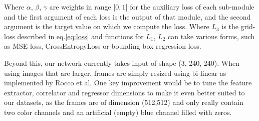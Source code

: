 \documentclass[10pt,conference,compsocconf]{IEEEtran}
\begin{document}
Where $\alpha$, $\beta$, $\gamma$ are weights in range $]0,1]$ for the auxiliary loss of each sub-module and the first argument of each loss is the output of that module, and the second argument is the target value on which we compute the loss. Where $L_{3}$ is the grid-loss described in eq.\ref{eq:loss} and functions for $L_{1}$, $L_{2}$ can take various forms, such as MSE loss, CrossEntropyLoss or bounding box regression loss. 

Beyond this, our network currently takes input of shape (3, 240, 240). When using images that are larger, frames are simply resized using bi-linear as implemented by Rocco et al. One key improvement would be to tune the feature extractor, correlator and regressor dimensions to make it even better suited to our datasets, as the frames are of dimension (512,512) and only really contain two color channels and an artificial (empty) blue channel filled with zeros.

\newpage
\end{document}
